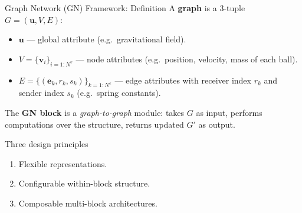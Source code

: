 \documentclass[10pt]{beamer}
\begin{document}
\begin{frame}{Graph Network (GN) Framework: Definition}
A \textbf{graph} is a 3-tuple $G = (\mathbf{u}, V, E)$:
\begin{itemize}
    \item $\mathbf{u}$ --- global attribute (e.g.\ gravitational field).
    \item $V = \{\mathbf{v}_i\}_{i=1:N^v}$ --- node attributes (e.g.\ position, velocity, mass of each ball).
    \item $E = \{(\mathbf{e}_k, r_k, s_k)\}_{k=1:N^e}$ --- edge attributes with receiver index $r_k$ and sender index $s_k$ (e.g.\ spring constants).
\end{itemize}

\vspace{0.4cm}
The \textbf{GN block} is a \emph{graph-to-graph} module: takes $G$ as input,
performs computations over the structure, returns updated $G'$ as output.

\vspace{0.3cm}
\begin{block}{Three design principles}
\begin{enumerate}
    \item Flexible representations.
    \item Configurable within-block structure.
    \item Composable multi-block architectures.
\end{enumerate}
\end{block}
\end{frame}
\end{document}
